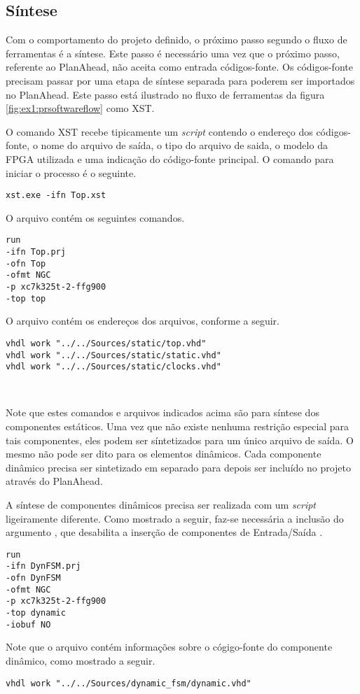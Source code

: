 \documentclass[11pt,a4paper,oneside]{book}
\begin{document}
\subsection{Síntese}
Com o comportamento do projeto definido, o próximo passo segundo o fluxo de ferramentas é a síntese.
Este passo é necessário uma vez que o próximo passo, referente ao PlanAhead, não aceita como entrada códigos-fonte.
Os códigos-fonte precisam passar por uma etapa de síntese separada para poderem ser importados no PlanAhead.
Este passo está ilustrado no fluxo de ferramentas da figura \ref{fig:ex1:prsoftwareflow} como XST.

O comando XST recebe tipicamente um \textit{script} contendo o endereço dos códigos-fonte, o nome do arquivo de saída, o tipo do arquivo de saida, o modelo da FPGA utilizada e uma indicação do código-fonte principal.
O comando para iniciar o processo é o seguinte.
\begin{lstlisting}[style=customVHDL]
xst.exe -ifn Top.xst
\end{lstlisting}
O arquivo  contém os seguintes comandos.
\begin{lstlisting}[style=customVHDL]
run
-ifn Top.prj
-ofn Top
-ofmt NGC
-p xc7k325t-2-ffg900
-top top
\end{lstlisting}
O arquivo  contém os endereços dos arquivos, conforme a seguir.
\begin{lstlisting}[style=customVHDL]
vhdl work "../../Sources/static/top.vhd"
vhdl work "../../Sources/static/static.vhd"
vhdl work "../../Sources/static/clocks.vhd"
\end{lstlisting}\

Note que estes comandos e arquivos indicados acima são para síntese dos componentes estáticos.
Uma vez que não existe nenhuma restrição especial para tais componentes, eles podem ser síntetizados para um único arquivo de saída.
O mesmo não pode ser dito para os elementos dinâmicos.
Cada componente dinâmico precisa ser sintetizado em separado para depois ser incluído no projeto através do PlanAhead.

A síntese de componentes dinâmicos precisa ser realizada com um \textit{script}  ligeiramente diferente.
Como mostrado a seguir, faz-se necessária a inclusão do argumento , que desabilita a inserção de componentes de Entrada/Saída \cite{ug743, ug748}.
\begin{lstlisting}[style=customVHDL]
run
-ifn DynFSM.prj
-ofn DynFSM
-ofmt NGC
-p xc7k325t-2-ffg900
-top dynamic
-iobuf NO
\end{lstlisting}
Note que o arquivo  contém informações sobre o cógigo-fonte do componente dinâmico, como mostrado a seguir.
\begin{lstlisting}[style=customVHDL]
vhdl work "../../Sources/dynamic_fsm/dynamic.vhd"
\end{lstlisting}
\end{document}
